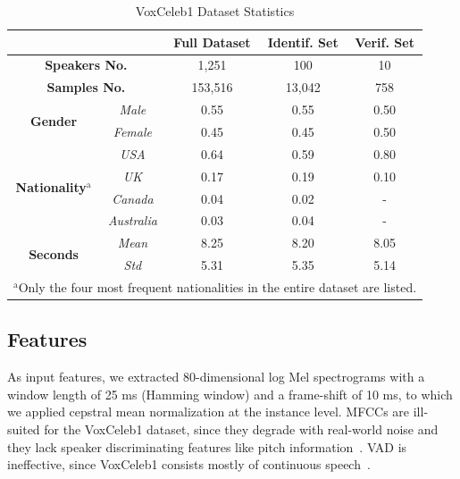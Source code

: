\documentclass[conference]{IEEEtran}
\begin{document}
\begin{table}[htbp]
    \caption{VoxCeleb1 Dataset Statistics}
    \begin{center}
        \begin{tabular}{|c|c|c|c|c|}
        \cline{3-5}
        \multicolumn{2}{c|}{\textbf{}} & \textbf{Full Dataset} & \textbf{Identif. Set} & \textbf{Verif. Set}\\
        \hline
        \multicolumn{2}{|c|}{\textbf{Speakers No.}} & 1,251 & 100 & 10\\
        \hline
        \multicolumn{2}{|c|}{\textbf{Samples No.}} & 153,516 & 13,042 & 758 \\
        \hline
        \multirow{2}{*}{\textbf{Gender}} & \textit{Male} & 0.55 & 0.55 & 0.50 \\
        & \textit{Female} & 0.45 & 0.45 & 0.50 \\
        \hline
        \multirow{4}{*}{\textbf{Nationality}$^{\mathrm{a}}$} & \textit{USA} & 0.64 & 0.59 & 0.80 \\
        & \textit{UK} & 0.17 & 0.19 & 0.10 \\
        & \textit{Canada} & 0.04 & 0.02 & - \\
        & \textit{Australia} & 0.03 & 0.04 & - \\
        \hline
        \multirow{2}{*}{\textbf{Seconds}} & \textit{Mean} & 8.25 & 8.20 & 8.05 \\
        & \textit{Std} & 5.31 & 5.35 & 5.14 \\
        \hline
        \multicolumn{5}{l}{$^{\mathrm{a}}$Only the four most frequent nationalities in the entire dataset are listed.}
        \end{tabular}
        \label{tab:dataset}
    \end{center}
\end{table}

\subsection{Features}

As input features, we extracted 80-dimensional log Mel spectrograms with a window length of 25 ms (Hamming window) and a frame-shift of 10 ms, to which we applied cepstral mean normalization at the instance level. MFCCs are ill-suited for the VoxCeleb1 dataset, since they degrade with real-world noise and they lack speaker discriminating features like pitch information~\cite{nagrani2020voxceleb}. VAD is ineffective, since VoxCeleb1 consists mostly of continuous speech~\cite{chung2020defence}.
\end{document}
